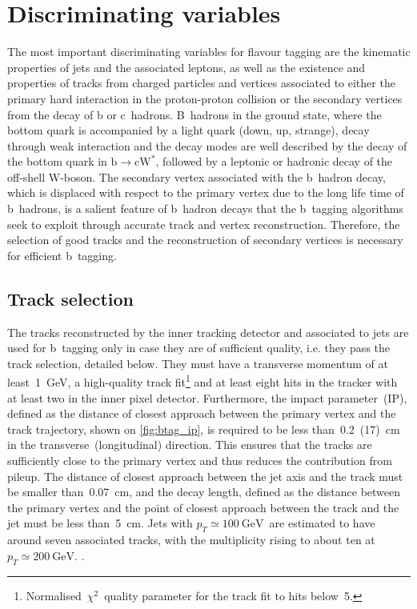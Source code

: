 \section{Discriminating variables}
The most important discriminating variables for flavour tagging are the kinematic properties of jets and the associated leptons, as well as the existence and properties of tracks from charged particles and vertices associated to either the primary hard interaction in the proton-proton collision or the secondary vertices from the decay of b or c~hadrons. B~hadrons in the ground state, where the bottom quark is accompanied by a light quark (down, up, strange), decay through weak interaction and the decay modes are well described by the decay of the bottom quark in $\mathrm{b} \rightarrow \mathrm{c} \mathrm{W}^{*}$, followed by a leptonic or hadronic decay of the off-shell W-boson. The secondary vertex associated with the b~hadron decay, which is displaced with respect to the primary vertex due to the long life time of b~hadrons, is a salient feature of b~hadron decays that the b~tagging algorithms seek to exploit through accurate track and vertex reconstruction. Therefore, the selection of good tracks and the reconstruction of secondary vertices is necessary for efficient b~tagging.

\subsection{Track selection}
The tracks reconstructed by the inner tracking detector and associated to jets are used for b~tagging only in case they are of sufficient quality, i.e. they pass the track selection, detailed below. They must have a transverse momentum of at least~1~GeV, a high-quality track fit\footnote{Normalised~$\chi^2$~quality parameter for the track fit to hits below~5.} and at least eight hits in the tracker with at least two in the inner pixel detector. Furthermore, the impact parameter~(IP), defined as the distance of closest approach between the primary vertex and the track trajectory, shown on \cref{fig:btag_ip}, is required to be less than~0.2~(17)~cm in the transverse~(longitudinal) direction. This ensures that the tracks are sufficiently close to the primary vertex and thus reduces the contribution from pileup. The distance of closest approach between the jet axis and the track must be smaller than~0.07~cm, and the decay length, defined as the distance between the primary vertex and the point of closest approach between the track and the jet must be less than~5~cm. Jets with $p_T \simeq 100~\mathrm{GeV}$~are estimated to have around seven associated tracks, with the multiplicity rising to about ten at $p_T \simeq 200~\mathrm{GeV}$. \cite{CMS-PAS-BTV-15-001}.

